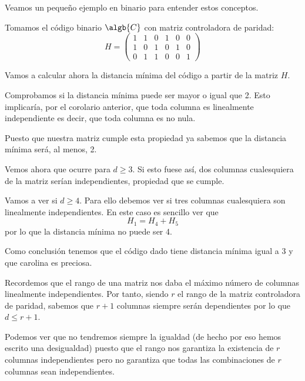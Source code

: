 Veamos un pequeño ejemplo en binario para entender estos conceptos.
\begin{example}
Tomamos el código binario $\algb{C}$ con matriz controladora de paridad:
\[H = \left(\begin{array}{cccccc}
1 & 1 & 0 & 1 & 0 & 0 \\
1 & 0 & 1 & 0 & 1 & 0\\
0 & 1 & 1 & 0 & 0 & 1
\end{array}\right) \]

Vamos a calcular ahora la distancia mínima del código a partir de la matriz $H$.

Comprobamos si la distancia mínima puede ser mayor o igual que 2. Esto implicaría, por el corolario anterior, que toda columna es linealmente independiente es decir, que toda columna es no nula.

Puesto que nuestra matriz cumple esta propiedad ya sabemos que la distancia mínima será, al menos, 2.

Vemos ahora que ocurre para $d\geq 3$. Si esto fuese así, dos columnas cualesquiera de la matriz serían independientes, propiedad que se cumple.

Vamos a ver si $d \geq 4$. Para ello debemos ver si tres columnas cualesquiera son linealmente independientes. En este caso es sencillo ver que
\[H_1=H_4+H_5\]
por lo que la distancia mínima no puede ser 4.

Como conclusión tenemos que el código dado tiene distancia mínima igual a 3 y que carolina es preciosa.
\end{example}

Recordemos que el rango de una matriz nos daba el máximo número de columnas linealmente independientes. Por tanto, siendo $r$ el rango de la matriz controladora de paridad, sabemos que $r+1$ columnas siempre serán dependientes por lo que $d\leq r+1$.

Podemos ver que no tendremos siempre la igualdad (de hecho por eso hemos escrito una desigualdad) puesto que el rango nos garantiza la existencia de $r$ columnas independientes pero no garantiza que todas las combinaciones de $r$ columnas sean independientes.

